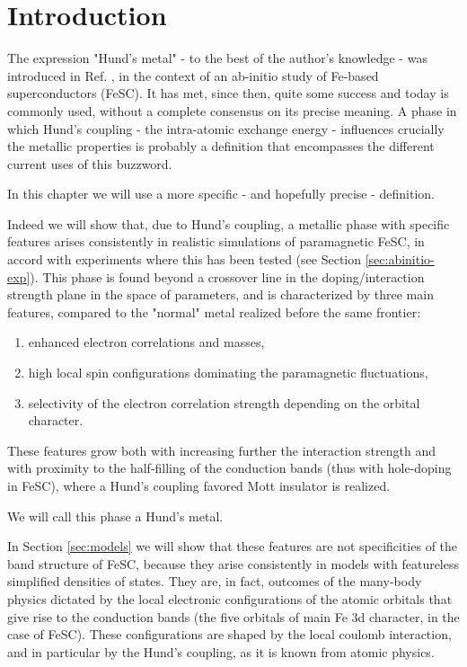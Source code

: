\documentclass[12pt,twoside]{article}
\begin{document}
\MakeTitle           %
\section{Introduction}
The expression "Hund's metal" - to the best of the author's knowledge - was introduced in Ref. \cite{Yin_kinetic_frustration_allFeSC}, in the context of an ab-initio study of Fe-based superconductors (FeSC). It has met, since then, quite some success\cite{Hirjibehedin_NatNano_News,Kondo_OSM_HundsMetal_SrRu2O4_surface} and today is commonly used, without a complete consensus on its precise meaning. A phase in which Hund's coupling - the intra-atomic exchange energy - influences crucially the metallic properties is probably a definition that encompasses the different current uses of this buzzword. 

In this chapter we will use a more specific - and hopefully precise - definition. 

Indeed we will show that, due to Hund's coupling, a metallic phase with specific features arises consistently in realistic simulations of paramagnetic FeSC, in accord with experiments where this has been tested (see Section \ref{sec:abinitio-exp}). This phase is found beyond a crossover line in the doping/interaction strength plane in the space of parameters, and is characterized by three main features, compared to the "normal" metal realized before the same frontier: 
\begin{enumerate}
\item enhanced electron correlations and masses,\\ 
\item high local spin configurations dominating the paramagnetic fluctuations,\\
\item selectivity of the electron correlation strength depending on the orbital character.\\
\end{enumerate}
These features grow both with increasing further the interaction strength and with proximity to the half-filling of the conduction bands (thus with hole-doping in FeSC), where a Hund's coupling favored Mott insulator is realized.

We will call this phase a Hund's metal.

In Section \ref{sec:models} we will show that these features are not specificities of the band structure of FeSC, because they arise consistently in models with featureless simplified densities of states. They are, in fact, outcomes of the many-body physics dictated by the local electronic configurations of the atomic orbitals that give rise to the conduction bands (the five orbitals of main Fe 3d character, in the case of FeSC). These configurations are shaped by the local coulomb interaction, and in particular by the Hund's coupling\cite{georges_annrev}, as it is known from atomic physics.
\end{document}
